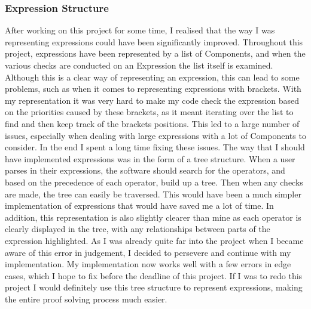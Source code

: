 \subsubsection{Expression Structure}
After working on this project for some time, I realised that the way I was representing expressions could have been significantly improved. Throughout this project, expressions have been represented by a list of Components, and when the various checks are conducted on an Expression the list itself is examined. Although this is a clear way of representing an expression, this can lead to some problems, such as when it comes to representing expressions with brackets. With my representation it was very hard to make my code check the expression based on the priorities caused by these brackets, as it meant iterating over the list to find and then keep track of the brackets positions. This led to a large number of issues, especially when dealing with large expressions with a lot of Components to consider. In the end I spent a long time fixing these issues. The way that I should have implemented expressions was in the form of a tree structure. When a user parses in their expressions, the software should search for the operators, and based on the precedence of each operator, build up a tree. Then when any checks are made, the tree can easily be traversed. This would have been a much simpler implementation of expressions that would have saved me a lot of time. In addition, this representation is also slightly clearer than mine as each operator is clearly displayed in the tree, with any relationships between parts of the expression highlighted. As I was already quite far into the project when I became aware of this error in judgement, I decided to persevere and continue with my implementation. My implementation now works well with a few errors in edge cases, which I hope to fix before the deadline of this project. If I was to redo this project I would definitely use this tree structure to represent expressions, making the entire proof solving process much easier.

